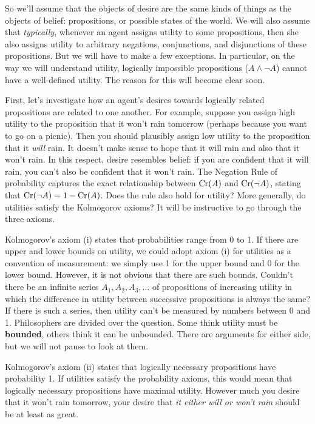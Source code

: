 So we'll assume that the objects of desire are the same kinds of
things as the objects of belief: propositions, or possible states of
the world. We will also assume that \emph{typically}, whenever an
agent assigns utility to some propositions, then she also assigns
utility to arbitrary negations, conjunctions, and disjunctions of
these propositions. But we will have to make a few exceptions. In
particular, on the way we will understand utility, logically impossible
propositions ($A \land \neg A$) cannot have a well-defined
utility. The reason for this will become clear soon.

First, let's investigate how an agent's desires towards logically
related propositions are related to one another. For example, suppose
you assign high utility to the proposition that it won't rain tomorrow
(perhaps because you want to go on a picnic). Then you should
plausibly assign low utility to the proposition that it \emph{will}
rain. It doesn't make sense to hope that it will rain and also that it
won't rain. In this respect, desire resembles belief: if you are
confident that it will rain, you can't also be confident that it won't
rain. The Negation Rule of probability captures the exact relationship
between $\text{Cr}(A)$ and $\text{Cr}(\neg A)$, stating that $\text{Cr}(\neg A) = 1 -
\text{Cr}(A)$. Does the rule also hold for utility?  More generally, do
utilities satisfy the Kolmogorov axioms?  It will be instructive to go
through the three axioms.

Kolmogorov's axiom (i) states that probabilities range from 0 to 1. If
there are upper and lower bounds on utility, we could adopt axiom (i)
for utilities as a convention of measurement: we simply use 1 for the
upper bound and 0 for the lower bound. However, it is not obvious that there
are such bounds. Couldn't there be an infinite series $A_1, A_2, A_3,
\ldots$ of propositions of increasing utility in which the difference
in utility between successive propositions is always the same? If
there is such a series, then utility can't be measured by numbers
between 0 and 1. Philosophers are divided over the question. Some
think utility must be \textbf{bounded}, others think it can be
unbounded. There are arguments for either side, but we will not pause
to look at them.

Kolmogorov's axiom (ii) states that logically necessary propositions
have probability 1. If utilities satisfy the probability axioms, this
would mean that logically necessary propositions have maximal
utility. However much you desire that it won't rain tomorrow, your
desire that \emph{it either will or won't rain} should be at least as
great.

